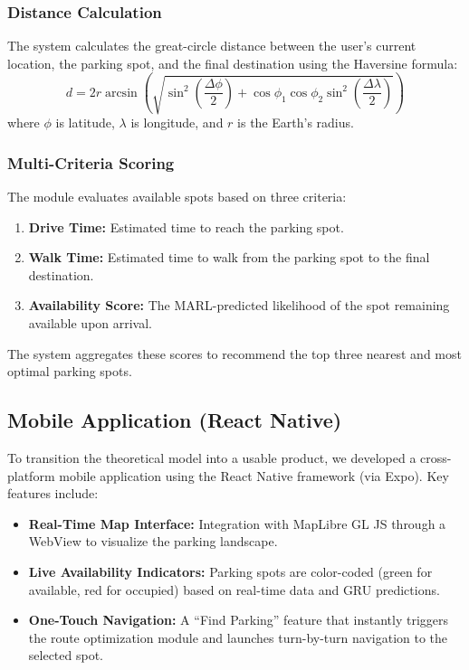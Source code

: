 \documentclass[conference]{IEEEtran}
\begin{document}
\subsubsection{Distance Calculation}
The system calculates the great-circle distance between the user's current location, the parking spot, and the final destination using the Haversine formula:
\begin{equation}
d = 2r \arcsin\left(\sqrt{\sin^2\left(\frac{\Delta \phi}{2}\right) + \cos\phi_1\cos\phi_2\sin^2\left(\frac{\Delta \lambda}{2}\right)}\right)
\end{equation}
where $\phi$ is latitude, $\lambda$ is longitude, and $r$ is the Earth's radius.

\subsubsection{Multi-Criteria Scoring}
The module evaluates available spots based on three criteria:
\begin{enumerate}
    \item \textbf{Drive Time:} Estimated time to reach the parking spot.
    \item \textbf{Walk Time:} Estimated time to walk from the parking spot to the final destination.
    \item \textbf{Availability Score:} The MARL-predicted likelihood of the spot remaining available upon arrival.
\end{enumerate}
The system aggregates these scores to recommend the top three nearest and most optimal parking spots.

\subsection{Mobile Application (React Native)}
To transition the theoretical model into a usable product, we developed a cross-platform mobile application using the React Native framework (via Expo). 
Key features include:
\begin{itemize}
    \item \textbf{Real-Time Map Interface:} Integration with MapLibre GL JS through a WebView to visualize the parking landscape.
    \item \textbf{Live Availability Indicators:} Parking spots are color-coded (green for available, red for occupied) based on real-time data and GRU predictions.
    \item \textbf{One-Touch Navigation:} A ``Find Parking'' feature that instantly triggers the route optimization module and launches turn-by-turn navigation to the selected spot.
\end{itemize}
\end{document}
